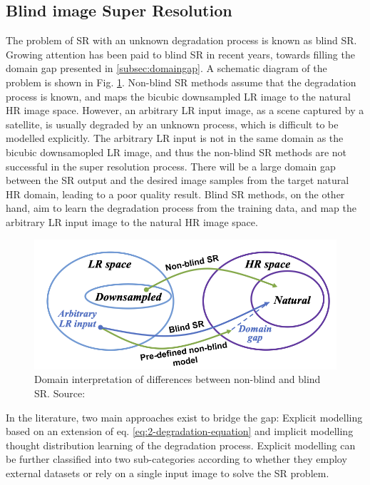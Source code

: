     \subsection{Blind image Super Resolution}

        The problem of SR with an unknown degradation process is known as blind SR. 
        Growing attention has been paid to blind SR in recent years, towards filling the domain gap presented in \ref{subsec:domaingap}.
        A schematic diagram of the problem is shown in Fig. \ref{fig:2-DomainGap}. 
        Non-blind SR methods assume that the degradation process is known, and maps the bicubic downsampled LR image to the natural HR image space.
        However, an arbitrary LR input image, as a scene captured by a satellite, is usually degraded by an unknown process, which is difficult to be modelled explicitly.
        The arbitrary LR input is not in the same domain as the bicubic downsamopled LR image, and thus the non-blind SR methods are not successful in the super resolution process.
        There will be a large domain gap between the SR output and the desired image samples from the target natural HR domain, leading to a poor quality result.
        Blind SR methods, on the other hand, aim to learn the degradation process from the training data, and map the arbitrary LR input image to the natural HR image space.
        
        \begin{figure}[H]
            \centering
            \includegraphics[width=\textwidth]{Includes/2-DomainGap.png}
            \caption{Domain interpretation of differences between non-blind and blind SR. Source: \cite{liu2021blind}}
            \label{fig:2-DomainGap}
        \end{figure}

        In the literature, two main approaches exist to bridge the gap: 
        Explicit modelling based on an extension of eq. \ref{eq:2-degradation-equation} and implicit modelling thought distribution learning of the degradation process.
        Explicit modelling can be further classified into two sub-categories according to whether they employ external datasets or rely on a single input image to solve the SR problem.



